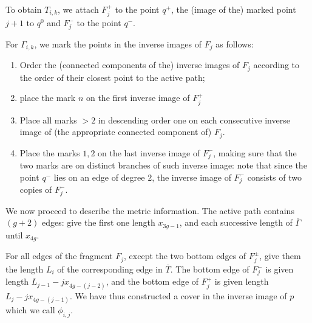 \documentclass[11pt,reqno]{amsart}
\theoremstyle{definition}
\begin{document}
To  obtain ${T_{i,k}}$, we attach $F_j^+$ to the point $q^+$, the (image of the) marked point $j+1$ to $q^0$ and $F_j^-$ to the point $q^-$.

For $\Gamma_{i,k}$, we mark the points in the inverse images of $F_j$ as follows:
\begin{enumerate}
    \item Order the  (connected components of the) inverse images of $F_j$ according to the order of their closest point to the active path;
    \item place the mark $n$ on the first inverse image of $F_j^+$
    \item Place all marks $>2$ in descending order one on each consecutive inverse image of (the appropriate connected component of) $F_j$.
    \item Place the marks $1,2$ on the last inverse image of $F_j^-$, making sure that the two marks are on distinct branches of such inverse image: note that since the point $q^-$ lies on an edge of degree $2$, the inverse image of  $F_j^-$ consists of two copies of $F_j^-$.
\end{enumerate}


We now proceed to describe the metric information. The active path contains $(g+2)$ edges: give the first one length $x_{3g-1}$, and each successive length of $\overline{\Gamma}$ until $x_{4g}$.

For all edges of the fragment $F_j$, except the two bottom edges of $F_j^\pm$, give them the length $L_i$ of the corresponding edge in $\overline{T}$.
The bottom edge of $F_j^-$ is given length $L_{j-1}-jx_{4g-(j-2)}$, and the bottom edge of $F_j^+$ is given length $L_{j}-jx_{4g-(j-1)}$. We have thus constructed a cover in the inverse image of $p$ which we call $\phi_{i,j}$.
\end{document}
